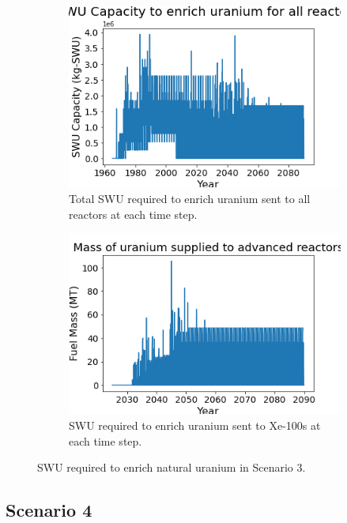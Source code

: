 \begin{figure}
    \centering
    \begin{subfigure}{0.4\textwidth}
        \centering
        \includegraphics[scale=0.3]{figures/totalswu_scenarios_3.png}
        \caption{Total \gls{SWU} required to enrich uranium sent to all reactors at each time step.}
        \label{fig:totalswu_3}
    \end{subfigure}
    \begin{subfigure}{0.4\textwidth}
        \centering
        \includegraphics[scale=0.3]{figures/advancedRX_fuelsupply_scenarios_3.png}
        \caption{\gls{SWU} required to enrich uranium sent to Xe-100s at each time step.}
        \label{fig:haleuswu_3}
    \end{subfigure}
    \caption{\gls{SWU} required to enrich natural uranium in Scenario 3.}
    \label{fig:swu_3}
\end{figure}

\subsection{Scenario 4}


